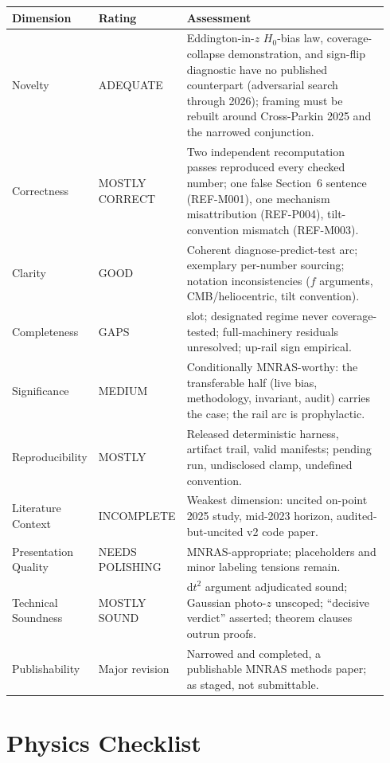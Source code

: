 \documentclass[11pt]{article}
\begin{document}
\begin{longtable}{@{}p{0.18\linewidth}p{0.17\linewidth}>{\raggedright\arraybackslash}p{0.59\linewidth}@{}}
\toprule
\textbf{Dimension} & \textbf{Rating} & \textbf{Assessment} \\
\midrule
\endhead
Novelty & ADEQUATE & Eddington-in-$z$ $H_0$-bias law, coverage-collapse demonstration, and sign-flip diagnostic have no published counterpart (adversarial search through 2026); framing must be rebuilt around Cross-Parkin 2025 and the narrowed conjunction. \\
Correctness & MOSTLY CORRECT & Two independent recomputation passes reproduced every checked number; one false Section~6 sentence (REF-M001), one mechanism misattribution (REF-P004), tilt-convention mismatch (REF-M003). \\
Clarity & GOOD & Coherent diagnose-predict-test arc; exemplary per-number sourcing; notation inconsistencies ($f$ arguments, CMB/heliocentric, tilt convention). \\
Completeness & GAPS & [RESULT PENDING] slot; designated regime never coverage-tested; full-machinery residuals unresolved; up-rail sign empirical. \\
Significance & MEDIUM & Conditionally MNRAS-worthy: the transferable half (live bias, methodology, invariant, audit) carries the case; the rail arc is prophylactic. \\
Reproducibility & MOSTLY & Released deterministic harness, artifact trail, valid manifests; pending run, undisclosed clamp, undefined convention. \\
Literature Context & INCOMPLETE & Weakest dimension: uncited on-point 2025 study, mid-2023 horizon, audited-but-uncited v2 code paper. \\
Presentation Quality & NEEDS POLISHING & MNRAS-appropriate; placeholders and minor labeling tensions remain. \\
Technical Soundness & MOSTLY SOUND & d$t^2$ argument adjudicated sound; Gaussian photo-$z$ unscoped; ``decisive verdict'' asserted; theorem clauses outrun proofs. \\
Publishability & Major revision & Narrowed and completed, a publishable MNRAS methods paper; as staged, not submittable. \\
\bottomrule
\end{longtable}

\section*{Physics Checklist}
\end{document}
